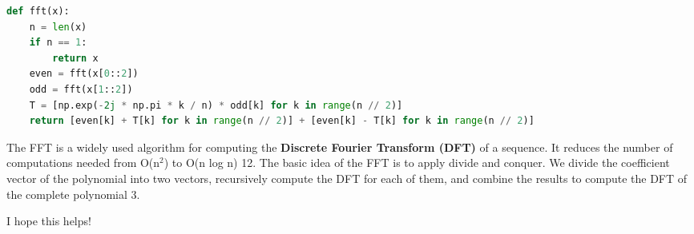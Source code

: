 \documentclass{mcmthesis}
\begin{document}
\begin{ReportAiUse}{9}
\begin{lstlisting}[language=python]
def fft(x):
    n = len(x)
    if n == 1:
        return x
    even = fft(x[0::2])
    odd = fft(x[1::2])
    T = [np.exp(-2j * np.pi * k / n) * odd[k] for k in range(n // 2)]
    return [even[k] + T[k] for k in range(n // 2)] + [even[k] - T[k] for k in range(n // 2)]
\end{lstlisting}
The FFT is a widely used algorithm for computing the \textbf{Discrete Fourier Transform (DFT)} of a sequence. It reduces the number of computations needed from O(n$^2$) to O(n log n) 12. The basic idea of the FFT is to apply divide and conquer. We divide the coefficient vector of the polynomial into two vectors, recursively compute the DFT for each of them, and combine the results to compute the DFT of the complete polynomial 3.

I hope this helps!

\end{ReportAiUse}
\end{document}
